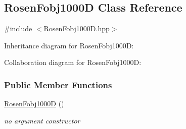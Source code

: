 \hypertarget{classRosenFobj1000D}{\subsection{\-Rosen\-Fobj1000\-D \-Class \-Reference}
\label{classRosenFobj1000D}
}


{\ttfamily \#include $<$\-Rosen\-Fobj1000\-D.\-hpp$>$}



\-Inheritance diagram for \-Rosen\-Fobj1000\-D\-:


\-Collaboration diagram for \-Rosen\-Fobj1000\-D\-:
\subsubsection*{\-Public \-Member \-Functions}
\begin{DoxyCompactItemize}
\item 
\hyperlink{classRosenFobj1000D_aee02bd644702a0eb852396cb0108a0aa}{\-Rosen\-Fobj1000\-D} ()
\begin{DoxyCompactList}\small\item\em no argument constructor \end{DoxyCompactList}\item 

\end{DoxyCompactItemize}
